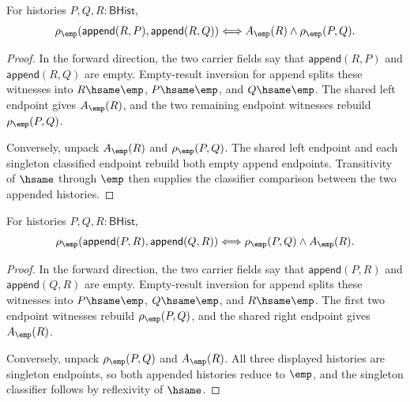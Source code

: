\begin{theorem}
\label{thm:matrix-singleton-classifier-append-left-cancellation}
For histories $P,Q,R:\mathsf{BHist}$,
$$
\rho_{\emp}(\mathsf{append}(R,P),\mathsf{append}(R,Q))
\Longleftrightarrow
A_{\emp}(R)\land \rho_{\emp}(P,Q).
$$
\end{theorem}
\begin{proof}
In the forward direction, the two carrier fields say that
$\mathsf{append}(R,P)$ and $\mathsf{append}(R,Q)$ are empty. Empty-result
inversion for append splits these witnesses into $R\hsame\emp$,
$P\hsame\emp$, and $Q\hsame\emp$. The shared left endpoint gives
$A_{\emp}(R)$, and the two remaining endpoint witnesses rebuild
$\rho_{\emp}(P,Q)$.

Conversely, unpack $A_{\emp}(R)$ and $\rho_{\emp}(P,Q)$. The shared left
endpoint and each singleton classified endpoint rebuild both empty append
endpoints. Transitivity of $\hsame$ through $\emp$ then supplies the classifier
comparison between the two appended histories.
\end{proof}

\begin{theorem}
\label{thm:matrix-singleton-classifier-append-right-cancellation}
For histories $P,Q,R:\mathsf{BHist}$,
$$
\rho_{\emp}(\mathsf{append}(P,R),\mathsf{append}(Q,R))
\Longleftrightarrow
\rho_{\emp}(P,Q)\land A_{\emp}(R).
$$
\end{theorem}
\begin{proof}
In the forward direction, the two carrier fields say that
$\mathsf{append}(P,R)$ and $\mathsf{append}(Q,R)$ are empty. Empty-result
inversion for append splits these witnesses into $P\hsame\emp$,
$Q\hsame\emp$, and $R\hsame\emp$. The first two endpoint witnesses rebuild
$\rho_{\emp}(P,Q)$, and the shared right endpoint gives $A_{\emp}(R)$.

Conversely, unpack $\rho_{\emp}(P,Q)$ and $A_{\emp}(R)$. All three displayed
histories are singleton endpoints, so both appended histories reduce to
$\emp$, and the singleton classifier follows by reflexivity of $\hsame$.
\end{proof}


